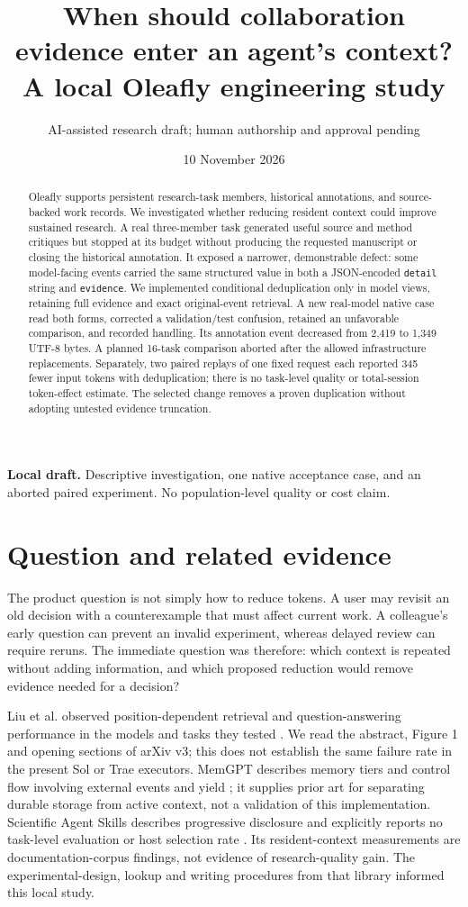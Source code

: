 \documentclass[11pt,a4paper]{article}
\title{When should collaboration evidence enter an agent's context?\\\large A local Oleafly engineering study}
\author{AI-assisted research draft; human authorship and approval pending}
\date{10 November 2026}
\begin{document}
\maketitle
\begin{center}\small\textbf{Local draft.} Descriptive investigation, one native acceptance case, and an aborted paired experiment. No population-level quality or cost claim.\end{center}
\begin{abstract}
Oleafly supports persistent research-task members, historical annotations, and source-backed work records. We investigated whether reducing resident context could improve sustained research. A real three-member task generated useful source and method critiques but stopped at its budget without producing the requested manuscript or closing the historical annotation. It exposed a narrower, demonstrable defect: some model-facing events carried the same structured value in both a JSON-encoded \texttt{detail} string and \texttt{evidence}. We implemented conditional deduplication only in model views, retaining full evidence and exact original-event retrieval. A new real-model native case read both forms, corrected a validation/test confusion, retained an unfavorable comparison, and recorded handling. Its annotation event decreased from 2,419 to 1,349 UTF-8 bytes. A planned 16-task comparison aborted after the allowed infrastructure replacements. Separately, two paired replays of one fixed request each reported 345 fewer input tokens with deduplication; there is no task-level quality or total-session token-effect estimate. The selected change removes a proven duplication without adopting untested evidence truncation.
\end{abstract}

\section{Question and related evidence}
The product question is not simply how to reduce tokens. A user may revisit an old decision with a counterexample that must affect current work. A colleague's early question can prevent an invalid experiment, whereas delayed review can require reruns. The immediate question was therefore: which context is repeated without adding information, and which proposed reduction would remove evidence needed for a decision?

Liu et al. observed position-dependent retrieval and question-answering performance in the models and tasks they tested \cite{liu2024-middle}. We read the abstract, Figure 1 and opening sections of arXiv v3; this does not establish the same failure rate in the present Sol or Trae executors. MemGPT describes memory tiers and control flow involving external events and yield \cite{packer2024-memgpt}; it supplies prior art for separating durable storage from active context, not a validation of this implementation. Scientific Agent Skills describes progressive disclosure and explicitly reports no task-level evaluation or host selection rate \cite{kassis2026-skills}. Its resident-context measurements are documentation-corpus findings, not evidence of research-quality gain. The experimental-design, lookup and writing procedures from that library informed this local study.
\end{document}
